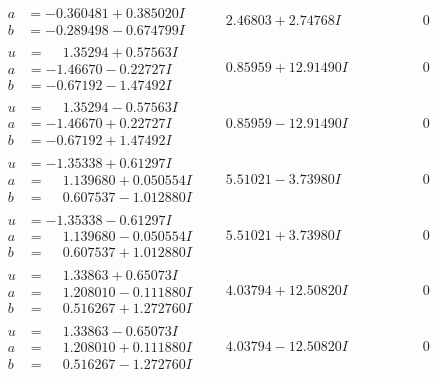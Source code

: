 \documentclass[1p]{elsarticle_modified}
\theoremstyle{definition}
\begin{document}
$$\begin{array}{c|c|c}
\begin{aligned}
a &= -0.360481 + 0.385020 I \\
b &= -0.289498 - 0.674799 I\end{aligned}
 & \phantom{-}2.46803 + 2.74768 I & \phantom{-0.000000 } 0 \\ \hline\begin{aligned}
u &= \phantom{-}1.35294 + 0.57563 I \\
a &= -1.46670 - 0.22727 I \\
b &= -0.67192 - 1.47492 I\end{aligned}
 & \phantom{-}0.85959 + 12.91490 I & \phantom{-0.000000 } 0 \\ \hline\begin{aligned}
u &= \phantom{-}1.35294 - 0.57563 I \\
a &= -1.46670 + 0.22727 I \\
b &= -0.67192 + 1.47492 I\end{aligned}
 & \phantom{-}0.85959 - 12.91490 I & \phantom{-0.000000 } 0 \\ \hline\begin{aligned}
u &= -1.35338 + 0.61297 I \\
a &= \phantom{-}1.139680 + 0.050554 I \\
b &= \phantom{-}0.607537 - 1.012880 I\end{aligned}
 & \phantom{-}5.51021 - 3.73980 I & \phantom{-0.000000 } 0 \\ \hline\begin{aligned}
u &= -1.35338 - 0.61297 I \\
a &= \phantom{-}1.139680 - 0.050554 I \\
b &= \phantom{-}0.607537 + 1.012880 I\end{aligned}
 & \phantom{-}5.51021 + 3.73980 I & \phantom{-0.000000 } 0 \\ \hline\begin{aligned}
u &= \phantom{-}1.33863 + 0.65073 I \\
a &= \phantom{-}1.208010 - 0.111880 I \\
b &= \phantom{-}0.516267 + 1.272760 I\end{aligned}
 & \phantom{-}4.03794 + 12.50820 I & \phantom{-0.000000 } 0 \\ \hline\begin{aligned}
u &= \phantom{-}1.33863 - 0.65073 I \\
a &= \phantom{-}1.208010 + 0.111880 I \\
b &= \phantom{-}0.516267 - 1.272760 I\end{aligned}
 & \phantom{-}4.03794 - 12.50820 I & \phantom{-0.000000 } 0 \\ \hline\begin{aligned}

\end{aligned}
\end{array}$$
\end{document}
